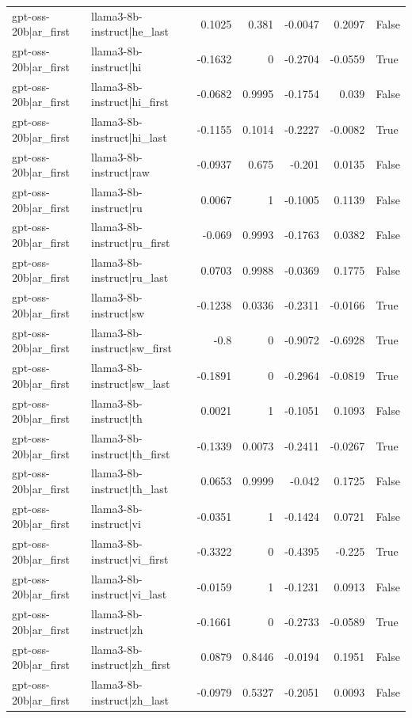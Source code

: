 \begin{table}
\begin{tabular}{l l r r r r l}
gpt-oss-20b|ar_first & llama3-8b-instruct|he_last & 0.1025 & 0.381 & -0.0047 & 0.2097 & False \\
gpt-oss-20b|ar_first & llama3-8b-instruct|hi & -0.1632 & 0 & -0.2704 & -0.0559 & True \\
gpt-oss-20b|ar_first & llama3-8b-instruct|hi_first & -0.0682 & 0.9995 & -0.1754 & 0.039 & False \\
gpt-oss-20b|ar_first & llama3-8b-instruct|hi_last & -0.1155 & 0.1014 & -0.2227 & -0.0082 & True \\
gpt-oss-20b|ar_first & llama3-8b-instruct|raw & -0.0937 & 0.675 & -0.201 & 0.0135 & False \\
gpt-oss-20b|ar_first & llama3-8b-instruct|ru & 0.0067 & 1 & -0.1005 & 0.1139 & False \\
gpt-oss-20b|ar_first & llama3-8b-instruct|ru_first & -0.069 & 0.9993 & -0.1763 & 0.0382 & False \\
gpt-oss-20b|ar_first & llama3-8b-instruct|ru_last & 0.0703 & 0.9988 & -0.0369 & 0.1775 & False \\
gpt-oss-20b|ar_first & llama3-8b-instruct|sw & -0.1238 & 0.0336 & -0.2311 & -0.0166 & True \\
gpt-oss-20b|ar_first & llama3-8b-instruct|sw_first & -0.8 & 0 & -0.9072 & -0.6928 & True \\
gpt-oss-20b|ar_first & llama3-8b-instruct|sw_last & -0.1891 & 0 & -0.2964 & -0.0819 & True \\
gpt-oss-20b|ar_first & llama3-8b-instruct|th & 0.0021 & 1 & -0.1051 & 0.1093 & False \\
gpt-oss-20b|ar_first & llama3-8b-instruct|th_first & -0.1339 & 0.0073 & -0.2411 & -0.0267 & True \\
gpt-oss-20b|ar_first & llama3-8b-instruct|th_last & 0.0653 & 0.9999 & -0.042 & 0.1725 & False \\
gpt-oss-20b|ar_first & llama3-8b-instruct|vi & -0.0351 & 1 & -0.1424 & 0.0721 & False \\
gpt-oss-20b|ar_first & llama3-8b-instruct|vi_first & -0.3322 & 0 & -0.4395 & -0.225 & True \\
gpt-oss-20b|ar_first & llama3-8b-instruct|vi_last & -0.0159 & 1 & -0.1231 & 0.0913 & False \\
gpt-oss-20b|ar_first & llama3-8b-instruct|zh & -0.1661 & 0 & -0.2733 & -0.0589 & True \\
gpt-oss-20b|ar_first & llama3-8b-instruct|zh_first & 0.0879 & 0.8446 & -0.0194 & 0.1951 & False \\
gpt-oss-20b|ar_first & llama3-8b-instruct|zh_last & -0.0979 & 0.5327 & -0.2051 & 0.0093 & False \\

\end{tabular}
\end{table}

